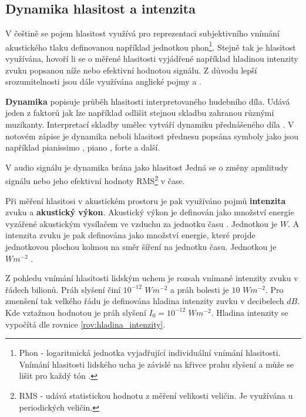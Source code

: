   \subsection{Dynamika hlasitost a intenzita} \label{sec:Dynamika}
  

  V češtině se pojem hlasitost využívá pro reprezentaci subjektivního vnímání akustického tlaku definovanou například jednotkou phon\footnote{Phon - logaritmická jednotka vyjadřující individuální vnímání hlasitosti. Vnímání hlasitosti lidského ucha je závislé na křivce prahu slyšení a může se lišit pro každý tón \cite{tumarkin_1950}.}. 
  Stejně tak je hlasitost využívána, hovoří li se o měřené hlasitosti vyjádřené například hladinou intenzity zvuku popsanou níže nebo efektivní hodnotou signálu.
  Z důvodu lepší srozumitelnosti jsou dále využívána anglické pojmy  a . 
  
  \textbf{Dynamika} popisuje průběh hlasitosti interpretovaného hudebního díla. Udává jeden z faktorů jak lze například odlišit stejnou skladbu zahranou různými muzikanty. Interpretací skladby umělec vytváří dynamiku přednášeného díla \cite{fundamental_of_music_processing}.
  V notovém zápise je dynamika neboli hlasitost přednesu popsána symboly jako jsou například pianissimo , piano , forte  a další.

  V audio signálu je dynamika brána jako hlasitost  Jedná se o změny apmlitudy signálu nebo jeho efektivní hodnoty \acs{RMS}\footnote{RMS - udává statistickou hodnotu z měření velikosti veličin. Je využívána u periodických veličin\cite{RMS_value}.} v čase.

  Při měření hlasitosi  v akustickém prostoru je pak využíváno pojmů \textbf{intenzita} zvuku a \textbf{akustický výkon}.
  Akustický výkon je definován jako množství energie  vyzářené akustickým vysílačem ve vzduchu za jednotku času \cite{acoustic_power}. Jednotkou je $W$.
  A intenzita zvuku je pak definována jako množství energie, které projde jednotkovou plochou kolmou na směr šíření na jednotku času. Jednotkou je $Wm^{-2}$ \cite{intenzita_zvuku_definice}.
  
  Z pohledu vnímání hlasitosti lidským uchem je rozsah vnímané intenzity zvuku v řádech bilionů. Práh slyšení činí $10^{-12}$ $Wm^{-2}$ a práh bolesti je $10$ $Wm^{-2}$.
  Pro zmenšení tak velkého řádu je definována hladina intenzity zuvku v decibelech $dB$. Kde vztažnou hodnotou je práh slyšení $I_0 = 10^{-12}$ $Wm^{-2}$.
  Hladina intenzity se vypočítá dle rovnice \ref{rov:hladina_intenzity}.

